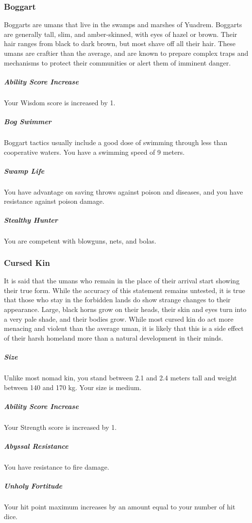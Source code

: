 \begin{linenumbers}
\subsubsection{Boggart}
Boggarts are umans that live in the swamps and marshes of Yuadrem.
Boggarts are generally tall, slim, and amber-skinned, with eyes of hazel or brown.
Their hair ranges from black to dark brown, but most shave off all their hair.
These umans are craftier than the average, and are known to prepare complex traps and mechanisms to protect their communities or alert them of imminent danger.

\subparagraph{Ability Score Increase} Your Wisdom score is increased by 1.

\subparagraph{Bog Swimmer} Boggart tactics usually include a good dose of swimming through less than cooperative waters.
You have a swimming speed of 9 meters.

\subparagraph{Swamp Life} You have advantage on saving throws against poison and diseases, and you have resistance against poison damage.

\subparagraph{Stealthy Hunter} You are competent with blowguns, nets, and bolas.

\subsubsection{Cursed Kin}
It is said that the umans who remain in the place of their arrival start showing their true form.
While the accuracy of this statement remains untested, it is true that those who stay in the forbidden lands do show strange changes to their appearance.
Large, black horns grow on their heads, their skin and eyes turn into a very pale shade, and their bodies grow.
While most cursed kin do act more menacing and violent than the average uman, it is likely that this is a side effect of their harsh homeland more than a natural development in their minds.

\subparagraph{Size} Unlike most nomad kin, you stand between 2.1 and 2.4 meters tall and weight between 140 and 170 kg.
Your size is medium.

\subparagraph{Ability Score Increase} Your Strength score is increased by 1.


\subparagraph{Abyssal Resistance} You have resistance to fire damage.

\subparagraph{Unholy Fortitude} Your hit point maximum increases by an amount equal to your number of hit dice.


\end{linenumbers}
